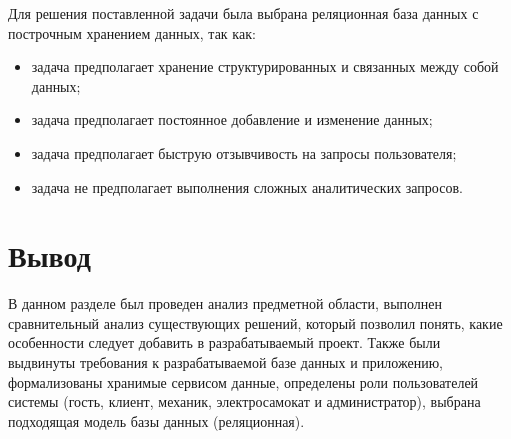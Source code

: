 Для решения поставленной задачи была выбрана реляционная база данных с построчным хранением данных, так как:

\begin{itemize}
	\item задача предполагает хранение структурированных и связанных между собой данных;
	\item задача предполагает постоянное добавление и изменение данных;
	\item задача предполагает быструю отзывчивость на запросы пользователя;
	\item задача не предполагает выполнения сложных аналитических запросов.
\end{itemize}

\section*{Вывод}

В данном разделе был проведен анализ предметной области, выполнен сравнительный анализ существующих решений, который позволил понять, какие особенности следует добавить в разрабатываемый проект. Также были выдвинуты требования к разрабатываемой базе данных и приложению, формализованы хранимые сервисом данные, определены роли пользователей системы (гость, клиент, механик, электросамокат и администратор), выбрана подходящая модель базы данных (реляционная).